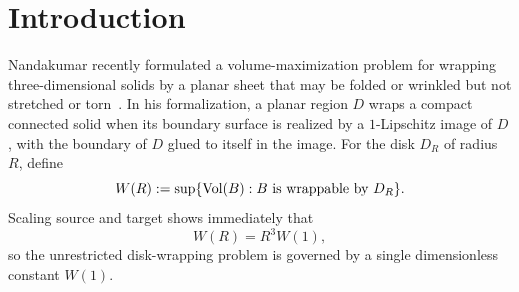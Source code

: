 \begin{abstract}
For the closed disk $D_R\subset\R^2$, let
\[
W(R):=\sup\{\Vol(B):B\text{ is wrappable by }D_R\}
\]
in the $1$-Lipschitz wrapping formalization of Nandakumar.  Scaling reduces the problem to the single dimensionless constant $W(1)$.  A universal area bound and the Euclidean isoperimetric inequality give
\[
W(R)\le \frac{\pi}{6}R^3.
\]
We also isolate the rotational-radial subclass: solids of revolution generated by a simple north--south meridian of length at most $R$, wrapped by the direct radial map.  Allowing the meridian to be nonconvex does not improve this subclass.  Its sharp value is the classical Mylar value
\[
W_{\rm rev}^{\rm rad}(R)
=\frac{\pi}{12I^2}R^3
=0.152315527\ldots R^3,
\qquad
I=\int_0^1\frac{du}{\sqrt{1-u^4}}.
\]
We then give a $17$-vertex, $30$-face non-axisymmetric polyhedral wrapping with exact volume
\[
C R^3,
\qquad
C=0.17984349416291615\ldots,
\]
certified by two independent exact-arithmetic programs.  Consequently
\[
W_{\rm rev}^{\rm rad}(R)<C R^3\le W(R),
\]
so the unrestricted problem strictly exceeds the sharp rotational-radial optimum by about $18.07\%$.  In this sense the construction exhibits a symmetry-breaking phenomenon at the level of optimal values.  Nandakumar's qualitative Question~1 is much weaker: under the same formalization it has a short elementary affirmative answer by making an arbitrarily small inward rotational notch in a suitable oblate spheroid.  The main point here is therefore quantitative: to begin locating the extremal constant $W(1)$ and to show that sharp rotational symmetry is already suboptimal.
\end{abstract}

\section{Introduction}
Nandakumar recently formulated a volume-maximization problem for wrapping three-dimensional solids by a planar sheet that may be folded or wrinkled but not stretched or torn~\cite{Nandakumar2026}.  In his formalization, a planar region $D$ wraps a compact connected solid when its boundary surface is realized by a $1$-Lipschitz image of $D$, with the boundary of $D$ glued to itself in the image.  For the disk $D_R$ of radius $R$, define
\begin{equation}\label{eq:Wdef}
W(R):=\sup\{\operatorname{Vol}(B):B\text{ is wrappable by }D_R\}.
\end{equation}
Scaling source and target shows immediately that
\begin{equation}\label{eq:scaling}
W(R)=R^3W(1),
\end{equation}
so the unrestricted disk-wrapping problem is governed by a single dimensionless constant $W(1)$.

